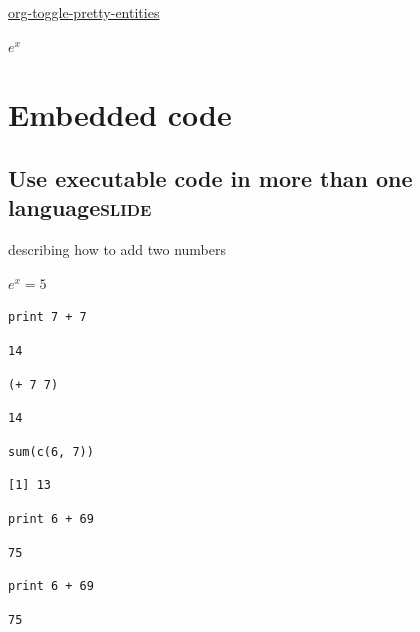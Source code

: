 \documentclass[11pt]{article}
\begin{document}
\url{org-toggle-pretty-entities}


\(e^x\)
\section{Embedded code}
\label{sec-11}

\subsection{Use executable code in more than one language\hfill{}\textsc{slide}}
\label{sec-11-1}

describing how to add two numbers

$e^x=5$
\begin{verbatim}
print 7 + 7
\end{verbatim}

\begin{verbatim}
14
\end{verbatim}




\begin{verbatim}
(+ 7 7)
\end{verbatim}

\begin{verbatim}
14
\end{verbatim}



\begin{verbatim}
sum(c(6, 7))
\end{verbatim}

\begin{verbatim}
[1] 13
\end{verbatim}



\begin{verbatim}
print 6 + 69
\end{verbatim}

\begin{verbatim}
75
\end{verbatim}


\begin{verbatim}
print 6 + 69
\end{verbatim}

\begin{verbatim}
75
\end{verbatim}
\end{document}
